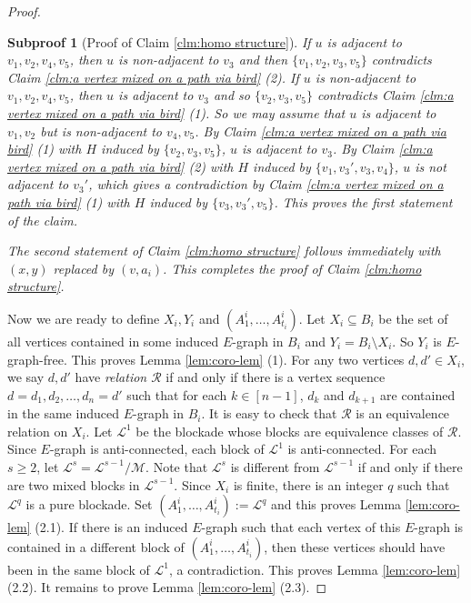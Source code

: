 \documentclass[10pt,a4paper]{amsart}
\newtheorem{subproof}{Subproof}
\begin{document}
\begin{proof}
\begin{subproof}[Proof of Claim \ref{clm:homo structure}]
            If $u$ is adjacent to $v_1,v_2,v_4,v_5$, then $u$ is non-adjacent to $v_3$ and then $\{v_1,v_2,v_3,v_5\}$ contradicts Claim \ref{clm:a vertex mixed on a path via bird} (2).
            If $u$ is non-adjacent to $v_1,v_2,v_4,v_5$, then $u$ is adjacent to $v_3$ and so $\{v_2,v_3,v_5\}$ contradicts Claim \ref{clm:a vertex mixed on a path via bird} (1).
            So we may assume that $u$ is adjacent to $v_1,v_2$ but is non-adjacent to $v_4,v_5$. 
            By Claim \ref{clm:a vertex mixed on a path via bird} (1) with $H$ induced by $\{v_2,v_3,v_5\}$, $u$ is adjacent to $v_3$. 
            By Claim \ref{clm:a vertex mixed on a path via bird} (2) with $H$ induced by $\{v_1,v_3',v_3,v_4\}$, $u$ is not adjacent to $v_3'$, which gives a contradiction by Claim \ref{clm:a vertex mixed on a path via bird} (1) with $H$ induced by $\{v_3,v_3',v_5\}$. 
            This proves the first statement of the claim.
            
            The second statement of Claim \ref{clm:homo structure} follows immediately with $(x,y)$ replaced by $(v,a_i)$. 
            This completes the proof of Claim \ref{clm:homo structure}. 
        \end{subproof}
        
        Now we are ready to define $X_i,Y_i$ and $(A^i_1,\ldots, A^i_{t_i})$. 
        Let $X_i\subseteq B_i$ be the set of all vertices contained in some induced $E$-graph in $B_i$ and $Y_i=B_i\setminus X_i$. So $Y_i$ is $E$-graph-free.   
        This proves Lemma \ref{lem:coro-lem} (1). 
        For any two vertices $d,d'\in X_i$, we say $d,d'$ have {\em relation $\mathcal{R}$} if and only if there is a vertex sequence $d=d_1,d_2,\ldots,d_n=d'$ such that for each $k\in [n-1]$, $d_k$ and $d_{k+1}$ are contained in the same induced $E$-graph in $B_i$. 
        It is easy to check that $\mathcal{R}$ is an equivalence relation on $X_i$. 
        Let $\mathcal{L}^1$ be the blockade whose blocks are equivalence classes of $\mathcal{R}$. 
        Since $E$-graph is anti-connected, each block of $\mathcal{L}^1$ is anti-connected. 
        For each $s\geq 2$, let $\mathcal{L}^{s}=\mathcal{L}^{s-1}/\mathcal{M}$. 
        Note that $\mathcal{L}^{s}$ is different from $\mathcal{L}^{s-1}$ if and only if there are two mixed blocks in $\mathcal{L}^{s-1}$.
        Since $X_i$ is finite, there is an integer $q$ such that $\mathcal{L}^{q}$ is a pure blockade. 
        Set $(A^i_1,\ldots, A^i_{t_i}):=\mathcal{L}^{q}$ and  
        this proves Lemma \ref{lem:coro-lem} (2.1). 
        If there is an induced $E$-graph such that each vertex of this $E$-graph is contained in a different block of $(A^i_1,\ldots,A^i_{t_i})$, then these vertices should have been in the same block of $\mathcal{L}^1$, a contradiction. 
        This proves Lemma \ref{lem:coro-lem} (2.2).
        It remains to prove Lemma \ref{lem:coro-lem} (2.3).
      

\end{proof}
\end{document}
